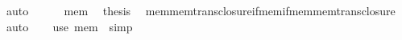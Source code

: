 \begin{isabellebody}
\ auto\isanewline
\ \ \ \ \isamarkupfalse%
\ mem\ \isamarkupfalse%
\ {\isacharquery}{\kern0pt}thesis\ \isamarkupfalse%
\ mem{\isacharunderscore}{\kern0pt}mem{\isacharunderscore}{\kern0pt}trans{\isacharunderscore}{\kern0pt}closure{\isacharunderscore}{\kern0pt}if{\isacharunderscore}{\kern0pt}mem{\isacharunderscore}{\kern0pt}if{\isacharunderscore}{\kern0pt}mem{\isacharunderscore}{\kern0pt}mem{\isacharunderscore}{\kern0pt}trans{\isacharunderscore}{\kern0pt}closure\ \isamarkupfalse%
\ auto\isanewline
\ \ \isamarkupfalse%
\ {\isacharparenleft}{\kern0pt}use\ mem\ \ simp{\isacharparenright}{\kern0pt}\isanewline
{}\isamarkupfalse%
%
\endisatagproof
{\isafoldproof}%
%
\isadelimproof
\isanewline
%
\endisadelimproof
\isanewline
%
\isadelimtheory
\isanewline
%
\endisadelimtheory
%
\isatagtheory
{}\isamarkupfalse%
%
\endisatagtheory
{\isafoldtheory}%
%
\isadelimtheory
%
\endisadelimtheory
%
\end{isabellebody}%
\endinput
